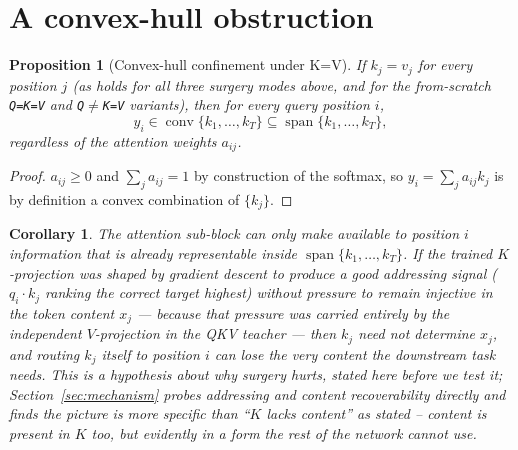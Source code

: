 \documentclass[11pt]{article}
\newtheorem{proposition}{Proposition}
\newtheorem{corollary}{Corollary}
\begin{document}
\section{A convex-hull obstruction}
\label{sec:hull}

\begin{proposition}[Convex-hull confinement under K=V]
\label{prop:hull}
If $k_j = v_j$ for every position $j$ (as holds for all three surgery modes above,
and for the from-scratch \texttt{Q=K=V} and \texttt{Q}$\neq$\texttt{K=V} variants),
then for every query position $i$,
\[
y_i \in \operatorname{conv}\{k_1, \dots, k_T\} \subseteq \operatorname{span}\{k_1,
\dots, k_T\},
\]
regardless of the attention weights $a_{ij}$.
\end{proposition}
\begin{proof}
$a_{ij} \geq 0$ and $\sum_j a_{ij} = 1$ by construction of the softmax, so $y_i =
\sum_j a_{ij} k_j$ is by definition a convex combination of $\{k_j\}$.
\end{proof}

\begin{corollary}
\label{cor:content}
The attention sub-block can only make available to position $i$ information that is
already representable inside $\operatorname{span}\{k_1,\dots,k_T\}$. If the trained
$K$-projection was shaped by gradient descent to produce a good \emph{addressing}
signal ($q_i \cdot k_j$ ranking the correct target highest) without pressure to remain
\emph{injective} in the token content $x_j$ --- because that pressure was carried
entirely by the independent $V$-projection in the QKV teacher --- then $k_j$ need not
determine $x_j$, and routing $k_j$ itself to position $i$ can lose the very content
the downstream task needs. This is a hypothesis about \emph{why} surgery hurts, stated
here before we test it; Section~\ref{sec:mechanism} probes addressing and content
recoverability directly and finds the picture is more specific than ``$K$ lacks
content'' as stated -- content is present in $K$ too, but evidently in a form the rest
of the network cannot use.
\end{corollary}
\end{document}
